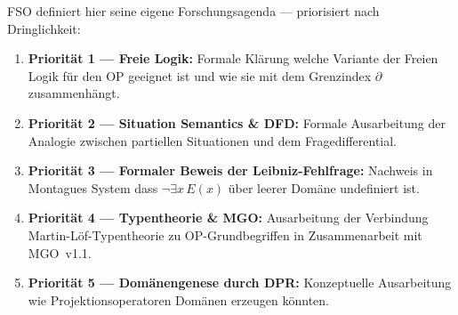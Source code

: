 \documentclass[11pt,a4paper]{article}
\theoremstyle{plain}
\theoremstyle{definition}
\begin{document}
FSO definiert hier seine eigene Forschungsagenda --- priorisiert nach Dringlichkeit:

\begin{enumerate}
  \item \textbf{Priorit\"{a}t 1 --- Freie Logik:} Formale Kl\"{a}rung welche
        Variante der Freien Logik f\"{u}r den OP geeignet ist und wie sie mit
        dem Grenzindex $\partial$ zusammenh\"{a}ngt.
  \item \textbf{Priorit\"{a}t 2 --- Situation Semantics \& DFD:} Formale
        Ausarbeitung der Analogie zwischen partiellen Situationen und dem
        Fragedifferential.
  \item \textbf{Priorit\"{a}t 3 --- Formaler Beweis der Leibniz-Fehlfrage:}
        Nachweis in Montagues System dass $\neg\exists x\, E(x)$ \"{u}ber leerer
        Dom\"{a}ne undefiniert ist.
  \item \textbf{Priorit\"{a}t 4 --- Typentheorie \& MGO:} Ausarbeitung der
        Verbindung Martin-L\"{o}f-Typentheorie zu OP-Grundbegriffen in
        Zusammenarbeit mit MGO~v1.1.
  \item \textbf{Priorit\"{a}t 5 --- Dom\"{a}nengenese durch DPR:} Konzeptuelle
        Ausarbeitung wie Projektionsoperatoren Dom\"{a}nen erzeugen k\"{o}nnten.
\end{enumerate}
\end{document}
